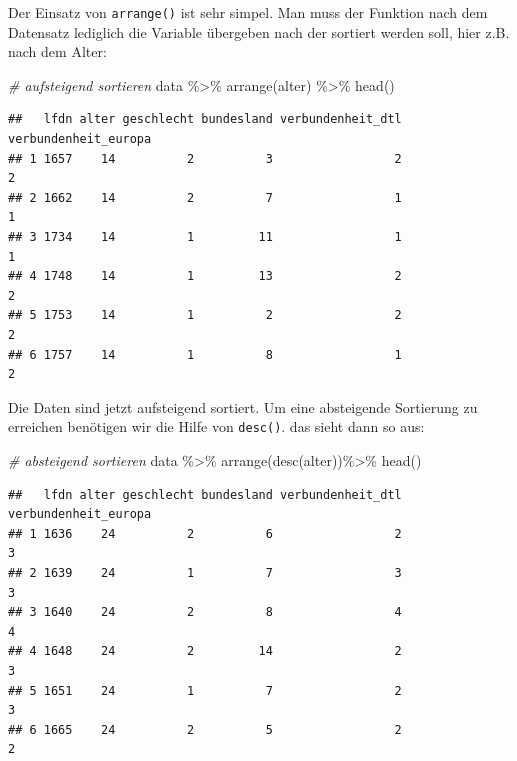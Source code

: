 \documentclass[
]{book}
\newenvironment{Shaded}{\begin{snugshade}}{\end{snugshade}}
\newcommand{\CommentTok}[1]{\textcolor[rgb]{0.56,0.35,0.01}{\textit{#1}}}
\newcommand{\FunctionTok}[1]{\textcolor[rgb]{0.00,0.00,0.00}{#1}}
\newcommand{\NormalTok}[1]{#1}
\newcommand{\SpecialCharTok}[1]{\textcolor[rgb]{0.00,0.00,0.00}{#1}}
\begin{document}
Der Einsatz von \texttt{arrange()} ist sehr simpel. Man muss der Funktion nach dem Datensatz lediglich die Variable übergeben nach der sortiert werden soll, hier z.B. nach dem Alter:

\begin{Shaded}
\begin{Highlighting}[]
\CommentTok{\# aufsteigend sortieren}
\NormalTok{data }\SpecialCharTok{\%\textgreater{}\%} 
  \FunctionTok{arrange}\NormalTok{(alter) }\SpecialCharTok{\%\textgreater{}\%} 
  \FunctionTok{head}\NormalTok{()}
\end{Highlighting}
\end{Shaded}

\begin{verbatim}
##   lfdn alter geschlecht bundesland verbundenheit_dtl verbundenheit_europa
## 1 1657    14          2          3                 2                    2
## 2 1662    14          2          7                 1                    1
## 3 1734    14          1         11                 1                    1
## 4 1748    14          1         13                 2                    2
## 5 1753    14          1          2                 2                    2
## 6 1757    14          1          8                 1                    2
\end{verbatim}

Die Daten sind jetzt aufsteigend sortiert. Um eine absteigende Sortierung zu erreichen benötigen wir die Hilfe von \texttt{desc()}. das sieht dann so aus:

\begin{Shaded}
\begin{Highlighting}[]
\CommentTok{\# absteigend sortieren}
\NormalTok{data }\SpecialCharTok{\%\textgreater{}\%} 
  \FunctionTok{arrange}\NormalTok{(}\FunctionTok{desc}\NormalTok{(alter))}\SpecialCharTok{\%\textgreater{}\%} 
  \FunctionTok{head}\NormalTok{()}
\end{Highlighting}
\end{Shaded}

\begin{verbatim}
##   lfdn alter geschlecht bundesland verbundenheit_dtl verbundenheit_europa
## 1 1636    24          2          6                 2                    3
## 2 1639    24          1          7                 3                    3
## 3 1640    24          2          8                 4                    4
## 4 1648    24          2         14                 2                    3
## 5 1651    24          1          7                 2                    3
## 6 1665    24          2          5                 2                    2
\end{verbatim}
\end{document}
